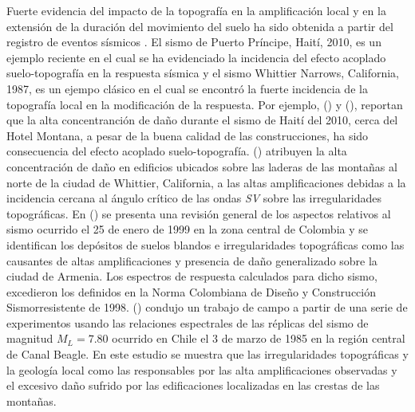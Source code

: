 \documentclass[spanish,letterpaper,12pt,twoside,openany]{article}
\begin{document}
Fuerte evidencia del impacto de la topografía en la amplificación local y en la extensión de la duración del movimiento del suelo ha sido obtenida a partir del registro de eventos sísmicos \citep{Hough2011, assimaki2005effects, spudich1996directional, kawase1990topography, celebi1987topographical, trifunac1971analysis}. El sismo de Puerto Príncipe, Haití, 2010, es un ejemplo reciente en el cual se ha evidenciado la incidencia del efecto acoplado suelo-topografía en la respuesta sísmica y el sismo Whittier Narrows, California, 1987, es un ejempo clásico en el cual se encontró la fuerte incidencia de la topografía local en la modificación de la respuesta. Por ejemplo, \citeauthor{Assimaki2013} (\citeyear{Assimaki2013}) y \citeauthor{Hough2011} (\citeyear{Hough2011}), reportan que la alta concentranción de daño durante el sismo de Haití del 2010, cerca del Hotel Montana, a pesar de la buena calidad de las construcciones, ha sido consecuencia del efecto acoplado suelo-topografía. \citeauthor{kawase1990topography} (\citeyear{kawase1990topography}) atribuyen la alta concentración de daño en edificios ubicados sobre las laderas de las montañas al norte de la ciudad de Whittier, California, a las altas amplificaciones debidas a la incidencia cercana al ángulo crítico de las ondas \textit{SV} sobre las irregularidades topográficas. En \citeauthor{SanchezSilva2000} (\citeyear{SanchezSilva2000}) se presenta una revisión general de los aspectos relativos al sismo ocurrido el 25 de enero de 1999 en la zona central de Colombia y se identifican los depósitos de suelos blandos e irregularidades topográficas como las causantes de altas amplificaciones y presencia de daño generalizado sobre la ciudad de Armenia. Los espectros de respuesta calculados para dicho sismo, excedieron los definidos en la Norma Colombiana de Diseño y Construcción Sismorresistente de 1998. \citeauthor{celebi1987topographical} (\citeyear{celebi1987topographical}) condujo un trabajo de campo a partir de una serie de experimentos usando las relaciones espectrales de las réplicas del sismo de magnitud $M_L=7.80$ ocurrido en Chile el 3 de marzo de 1985 en la región central de Canal Beagle. En este estudio se muestra que las irregularidades topográficas y la geología local como las responsables por las alta amplificaciones observadas y el excesivo daño sufrido por las edificaciones localizadas en las crestas de las montañas.
\end{document}

